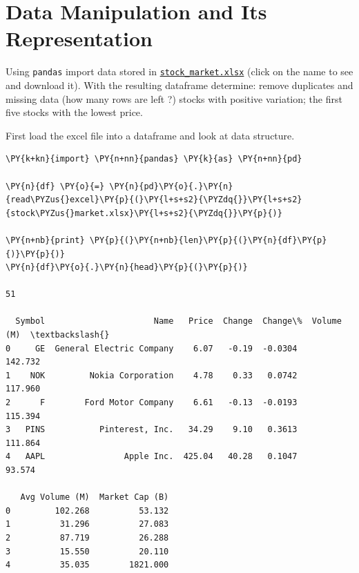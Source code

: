 \chapter{Data Manipulation and Its Representation}\label{introduction-to-python---lesson-5}

\begin{Exercise}
Using \texttt{pandas} import data stored in \href{https://drive.google.com/file/d/1Uu9lQorvzM-1xwRKPNszaSqlCYAiY-gr/view?usp=sharing}{\texttt{stock\_market.xlsx}} (click on the name to see and download it). With the resulting dataframe determine:
\Question remove duplicates and missing data (how many rows are left ?)
\Question stocks with positive variation;
\Question the first five stocks with the lowest price.
\end{Exercise}
\clearpage
\begin{Answer}
  \Question
First load the excel file into a dataframe and look at data structure.

\begin{tcolorbox}[size=fbox, boxrule=1pt, colback=cellbackground, colframe=cellborder]
\begin{Verbatim}[commandchars=\\\{\}]
\PY{k+kn}{import} \PY{n+nn}{pandas} \PY{k}{as} \PY{n+nn}{pd}

\PY{n}{df} \PY{o}{=} \PY{n}{pd}\PY{o}{.}\PY{n}{read\PYZus{}excel}\PY{p}{(}\PY{l+s+s2}{\PYZdq{}}\PY{l+s+s2}{stock\PYZus{}market.xlsx}\PY{l+s+s2}{\PYZdq{}}\PY{p}{)}

\PY{n+nb}{print} \PY{p}{(}\PY{n+nb}{len}\PY{p}{(}\PY{n}{df}\PY{p}{)}\PY{p}{)}
\PY{n}{df}\PY{o}{.}\PY{n}{head}\PY{p}{(}\PY{p}{)}

51

  Symbol                      Name   Price  Change  Change\%  Volume (M)  \textbackslash{}
0     GE  General Electric Company    6.07   -0.19  -0.0304     142.732
1    NOK         Nokia Corporation    4.78    0.33   0.0742     117.960
2      F        Ford Motor Company    6.61   -0.13  -0.0193     115.394
3   PINS           Pinterest, Inc.   34.29    9.10   0.3613     111.864
4   AAPL                Apple Inc.  425.04   40.28   0.1047      93.574

   Avg Volume (M)  Market Cap (B)
0         102.268          53.132
1          31.296          27.083
2          87.719          26.288
3          15.550          20.110
4          35.035        1821.000
\end{Verbatim}
\end{tcolorbox}
        

\end{Answer}
